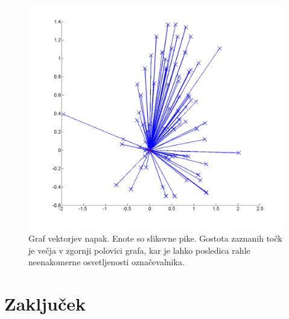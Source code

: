 \documentclass[a4paper, 12pt]{book}
\begin{document}
\begin{figure}[H]
\centering
\includegraphics[width=\textwidth,height=\textheight,keepaspectratio]{marker_detection_dynamic_errors.png}
\caption{Graf vektorjev napak. Enote so slikovne pike. Gostota zaznanih točk je večja v zgornji polovici grafa, kar je lahko posledica rahle neenakomerne osvetljenosti označevalnika.}
\end{figure}

\chapter{Zaključek}

{}

\end{document}
